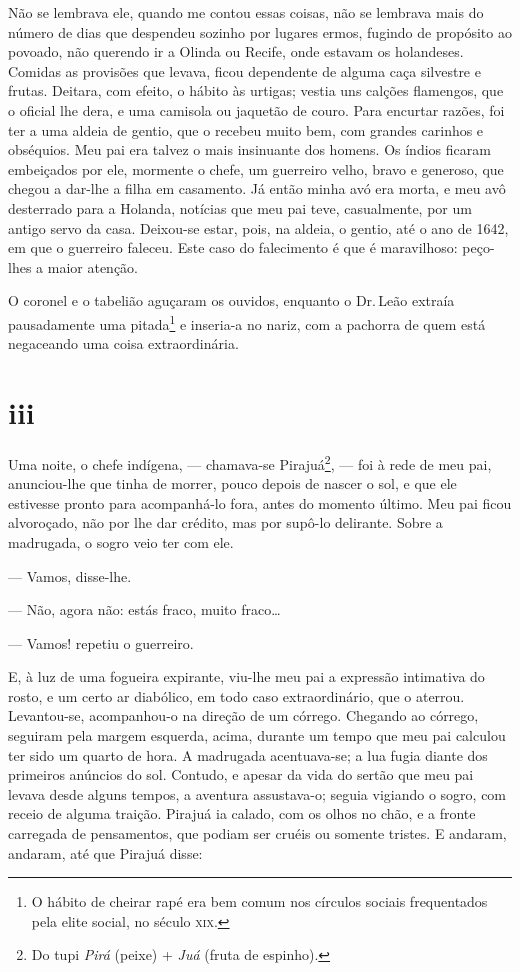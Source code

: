 Não se lembrava ele, quando me contou essas coisas, não se lembrava
mais do número de dias que despendeu sozinho por lugares ermos, fugindo
de propósito ao povoado, não querendo ir a Olinda ou Recife, onde
estavam os holandeses. Comidas as provisões que levava, ficou dependente
de alguma caça silvestre e frutas. Deitara, com efeito, o hábito às
urtigas; vestia uns calções flamengos, que o oficial lhe dera, e uma
camisola ou jaquetão de couro. Para encurtar razões, foi ter a uma
aldeia de gentio, que o recebeu muito bem, com grandes carinhos e
obséquios. Meu pai era talvez o mais insinuante dos homens. Os índios
ficaram embeiçados por ele, mormente o chefe, um guerreiro velho, bravo
e generoso, que chegou a dar-lhe a filha em casamento. Já então minha
avó era morta, e meu avô desterrado para a Holanda, notícias que meu pai
teve, casualmente, por um antigo servo da casa. Deixou-se estar, pois,
na aldeia, o gentio, até o ano de 1642, em que o guerreiro faleceu. Este
caso do falecimento é que é maravilhoso: peço-lhes a maior atenção.

O coronel e o tabelião aguçaram os ouvidos, enquanto o Dr.\,Leão extraía
pausadamente uma pitada\footnote{O hábito de cheirar rapé era bem comum
  nos círculos sociais frequentados pela elite social, no século \textsc{xix}.} e
inseria-a no nariz, com a pachorra de quem está negaceando uma coisa
extraordinária.



\section{iii}



Uma noite, o chefe indígena, --- chamava-se Pirajuá\footnote{Do tupi
  \emph{Pirá} (peixe) + \emph{Juá} (fruta de espinho).}, --- foi à rede
de meu pai, anunciou-lhe que tinha de morrer, pouco depois de nascer o
sol, e que ele estivesse pronto para acompanhá-lo fora, antes do momento
último. Meu pai ficou alvoroçado, não por lhe dar crédito, mas por
supô-lo delirante. Sobre a madrugada, o sogro veio ter com ele.

--- Vamos, disse-lhe.

--- Não, agora não: estás fraco, muito fraco\ldots{}

--- Vamos! repetiu o guerreiro.

E, à luz de uma fogueira expirante, viu-lhe meu pai a expressão
intimativa do rosto, e um certo ar diabólico, em todo caso
extraordinário, que o aterrou. Levantou-se, acompanhou-o na direção de
um córrego. Chegando ao córrego, seguiram pela margem esquerda, acima,
durante um tempo que meu pai calculou ter sido um quarto de hora. A
madrugada acentuava-se; a lua fugia diante dos primeiros anúncios do
sol. Contudo, e apesar da vida do sertão que meu pai levava desde alguns
tempos, a aventura assustava-o; seguia vigiando o sogro, com receio de
alguma traição. Pirajuá ia calado, com os olhos no chão, e a fronte
carregada de pensamentos, que podiam ser cruéis ou somente tristes. E
andaram, andaram, até que Pirajuá disse:

